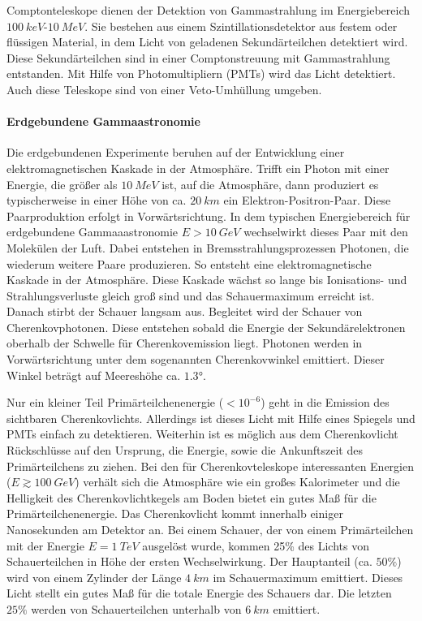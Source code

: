 Comptonteleskope dienen der Detektion von Gammastrahlung im Energiebereich $\SI{100}{keV}$-$\SI{10}{MeV}$.
Sie bestehen aus einem Szintillationsdetektor aus festem oder flüssigen Material, in dem Licht von geladenen Sekundärteilchen detektiert wird.
Diese Sekundärteilchen sind in einer Comptonstreuung mit Gammastrahlung entstanden.
Mit Hilfe von Photomultipliern (PMTs) wird das Licht detektiert.
Auch diese Teleskope sind von einer Veto-Umhüllung umgeben.\cite{Weekes}

\paragraph{Erdgebundene Gammaastronomie}
Die erdgebundenen Experimente beruhen auf der Entwicklung einer elektromagnetischen Kaskade in der Atmosphäre.
Trifft ein Photon mit einer Energie, die größer als $\SI{10}{MeV}$ ist, auf die Atmosphäre, dann produziert es typischerweise in einer Höhe von ca. $\SI{20}{km}$ ein Elektron-Positron-Paar.
Diese Paarproduktion erfolgt in Vorwärtsrichtung.
In dem typischen Energiebereich für erdgebundene Gammaaastronomie $E>\SI{10}{GeV}$ wechselwirkt dieses Paar mit den Molekülen der Luft.
Dabei entstehen in Bremsstrahlungsprozessen Photonen, die wiederum weitere Paare produzieren.
So entsteht eine elektromagnetische Kaskade in der Atmosphäre.
Diese Kaskade wächst so lange bis Ionisations- und Strahlungsverluste gleich groß sind und das Schauermaximum erreicht ist.
Danach stirbt der Schauer langsam aus.
Begleitet wird der Schauer von Cherenkovphotonen.
Diese entstehen sobald die Energie der Sekundärelektronen oberhalb der Schwelle für Cherenkovemission liegt.
Photonen werden in Vorwärtsrichtung unter dem sogenannten Cherenkovwinkel emittiert. 
Dieser Winkel beträgt auf Meereshöhe ca. $1.3°$.\cite{Weekes}

Nur ein kleiner Teil Primärteilchenenergie ($<10^{-6}$) geht in die Emission des sichtbaren Cherenkovlichts.
Allerdings ist dieses Licht mit Hilfe eines Spiegels und PMTs einfach zu detektieren.
Weiterhin ist es möglich aus dem Cherenkovlicht Rückschlüsse auf den Ursprung, die Energie, sowie die Ankunftszeit des Primärteilchens zu ziehen.
Bei den für Cherenkovteleskope interessanten Energien ($E\gtrsim \SI{100}{GeV}$) verhält sich die Atmosphäre wie ein großes Kalorimeter und die Helligkeit des Cherenkovlichtkegels am Boden bietet ein gutes Maß für die Primärteilchenenergie.
Das Cherenkovlicht kommt innerhalb einiger Nanosekunden am Detektor an.
Bei einem Schauer, der von einem Primärteilchen mit der Energie $E=\SI{1}{TeV}$ ausgelöst wurde, kommen 25\% des Lichts von Schauerteilchen in Höhe der ersten Wechselwirkung.
Der Hauptanteil (ca. $50\%$) wird von einem Zylinder der Länge $\SI{4}{km}$ im Schauermaximum emittiert.
Dieses Licht stellt ein gutes Maß für die totale Energie des Schauers dar.
Die letzten $25\%$ werden von Schauerteilchen unterhalb von $\SI{6}{km}$ emittiert.\cite{Weekes}

